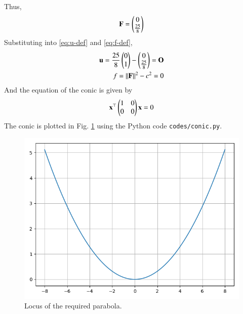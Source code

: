 \documentclass[journal,12pt,twocolumn]{IEEEtran}
\renewcommand{\vec}[1]{\boldsymbol{\mathbf{#1}}}
\begin{document}
\begin{enumerate}
    Thus,
    \begin{align}
        \vec{F} = \myvec{0\\\frac{25}{8}}
    \end{align}
    Substituting into \eqref{eq:u-def} and \eqref{eq:f-def},
    \begin{align}
        \vec{u} = \frac{25}{8}\myvec{0\\1} - \myvec{0\\\frac{25}{8}} = \vec{O} \\
        f = \norm{\vec{F}}^2 - c^2 = 0
    \end{align}
    And the equation of the conic is given by
    \begin{align}
        \vec{x}^\top\myvec{1&0\\0&0}\vec{x} = 0
    \end{align}
    The conic is plotted in Fig. \ref{fig:conic} using the Python code 
    \texttt{codes/conic.py}.
    \begin{figure}[!ht]
        \centering
        \includegraphics[width=\columnwidth]{figs/conic.png}
        \caption{Locus of the required parabola.}
        \label{fig:conic}
    \end{figure}
\end{enumerate}
\end{document}
